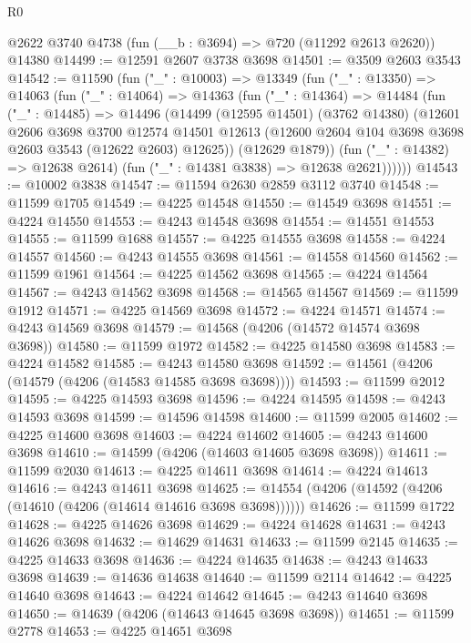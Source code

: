 \begin{lexlean}{R0}
\begin{coremodule}
    @2622
    @3740
    @4738
    (fun (__b : @3694) => @720 (@11292 @2613 @2620))
    @14380
@14499 := @12591 @2607 @3738 @3698
@14501 := @3509 @2603 @3543
@14542 := @11590
    (fun ("_" : @10003) =>
    @13349
      (fun ("_" : @13350) =>
      @14063
        (fun ("_" : @14064) =>
        @14363
          (fun ("_" : @14364) =>
          @14484
            (fun ("_" : @14485) =>
            @14496
              (@14499
                (@12595 @14501)
                (@3762 @14380)
                (@12601
                  @2606
                  @3698
                  @3700
                  @12574
                  @14501
                  @12613
                  (@12600 @2604 @104 @3698 @3698 @2603 @3543 (@12622 @2603) @12625))
                (@12629 @1879))
              (fun ("_" : @14382) => @12638 @2614)
              (fun ("_" : @14381 @3838) => @12638 @2621))))))
@14543 := @10002 @3838
@14547 := @11594 @2630 @2859 @3112 @3740
@14548 := @11599 @1705
@14549 := @4225 @14548
@14550 := @14549 @3698
@14551 := @4224 @14550
@14553 := @4243 @14548 @3698
@14554 := @14551 @14553
@14555 := @11599 @1688
@14557 := @4225 @14555 @3698
@14558 := @4224 @14557
@14560 := @4243 @14555 @3698
@14561 := @14558 @14560
@14562 := @11599 @1961
@14564 := @4225 @14562 @3698
@14565 := @4224 @14564
@14567 := @4243 @14562 @3698
@14568 := @14565 @14567
@14569 := @11599 @1912
@14571 := @4225 @14569 @3698
@14572 := @4224 @14571
@14574 := @4243 @14569 @3698
@14579 := @14568 (@4206 (@14572 @14574 @3698 @3698))
@14580 := @11599 @1972
@14582 := @4225 @14580 @3698
@14583 := @4224 @14582
@14585 := @4243 @14580 @3698
@14592 := @14561 (@4206 (@14579 (@4206 (@14583 @14585 @3698 @3698))))
@14593 := @11599 @2012
@14595 := @4225 @14593 @3698
@14596 := @4224 @14595
@14598 := @4243 @14593 @3698
@14599 := @14596 @14598
@14600 := @11599 @2005
@14602 := @4225 @14600 @3698
@14603 := @4224 @14602
@14605 := @4243 @14600 @3698
@14610 := @14599 (@4206 (@14603 @14605 @3698 @3698))
@14611 := @11599 @2030
@14613 := @4225 @14611 @3698
@14614 := @4224 @14613
@14616 := @4243 @14611 @3698
@14625 := @14554 (@4206 (@14592 (@4206 (@14610 (@4206 (@14614 @14616 @3698 @3698))))))
@14626 := @11599 @1722
@14628 := @4225 @14626 @3698
@14629 := @4224 @14628
@14631 := @4243 @14626 @3698
@14632 := @14629 @14631
@14633 := @11599 @2145
@14635 := @4225 @14633 @3698
@14636 := @4224 @14635
@14638 := @4243 @14633 @3698
@14639 := @14636 @14638
@14640 := @11599 @2114
@14642 := @4225 @14640 @3698
@14643 := @4224 @14642
@14645 := @4243 @14640 @3698
@14650 := @14639 (@4206 (@14643 @14645 @3698 @3698))
@14651 := @11599 @2778
@14653 := @4225 @14651 @3698

\end{coremodule}
\end{lexlean}
